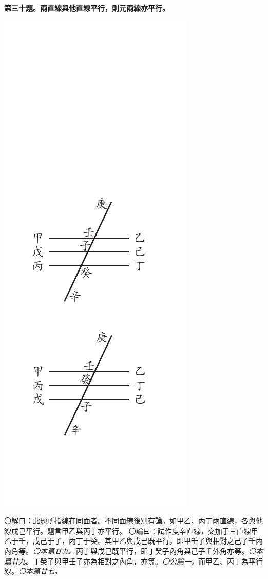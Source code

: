 \documentclass[12pt,b5paper,landscape]{article}
\newcommand{\ccom}[1]{{\footnotesize \emph{〇#1}}}
\newcommand{\bcom}[1]{〇#1}
\newcommand{\cthm}[1]{{
\vspace{8pt}

\bfseries #1}}
\begin{document}
\begin{multicols}{2}
\cthm{第三十題。兩直線與他直線平行，則元兩線亦平行。}
\begin{center}
      \includegraphics[angle=90]{eu76}
\end{center}
\bcom{解曰：此題所指線在同面者。不同面線後別有論。如甲乙、丙丁兩直線，各與他線戊己平行。題言甲乙與丙丁亦平行。}
\bcom{論曰：試作庚辛直線，交加于三直線甲乙于壬，戊己于子，丙丁于癸。其甲乙與戊己既平行，即甲壬子與相對之己子壬丙內角等。\ccom{本篇廿九。}丙丁與戊己既平行，即丁癸子內角與己子壬外角亦等。\ccom{本篇廿九。}丁癸子與甲壬子亦為相對之內角，亦等。\ccom{公論一。}而甲乙、丙丁為平行線。\ccom{本篇廿七。}}


\end{multicols}
\end{document}
